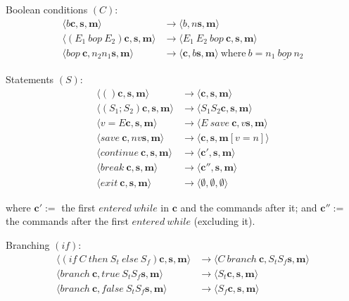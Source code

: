 \documentclass[11pt]{report}
\begin{document}
\vspace{2em}
\noindent Boolean conditions $(C)$:
\begin{align*}
\langle b  \bm{c},  \bm{s},  \bm{m} \rangle    &\rightarrow   \langle b, n  \bm{s},  \bm{m} \rangle \\
\langle (E_1 \ bop \ E_2)  \bm{c},  \bm{s},  \bm{m} \rangle    &\rightarrow   \langle E_1\ E_2\ bop \ \bm{c},  \bm{s},  \bm{m} \rangle \\
\langle bop \  \bm{c}, n_2 n_1  \bm{s},  \bm{m} \rangle    &\rightarrow   \langle  \bm{c}, b  \bm{s},  \bm{m} \rangle \  \text{where} \ b = n_1\ \underline{bop}\ n_2
\end{align*}


\vspace{2em}
\noindent Statements $(S)$:
\begin{align*}
\langle ()  \bm{c},  \bm{s},  \bm{m} \rangle    &\rightarrow   \langle  \bm{c},  \bm{s},  \bm{m} \rangle \\
\langle (S_1 ; S_2)  \bm{c},  \bm{s},  \bm{m} \rangle    &\rightarrow   \langle S_1 S_2  \bm{c},  \bm{s},  \bm{m} \rangle \\
\langle v=E  \bm{c},  \bm{s},  \bm{m} \rangle    &\rightarrow   \langle E\ save\  \bm{c}, v  \bm{s},  \bm{m} \rangle \\
\langle save \  \bm{c}, n v  \bm{s},  \bm{m} \rangle    &\rightarrow   \langle  \bm{c},  \bm{s},  \bm{m}[v=n] \rangle \\
\langle continue \  \bm{c}, \bm{s},  \bm{m} \rangle    &\rightarrow   \langle  \bm{c'},  \bm{s},  \bm{m} \rangle \\
\langle break \  \bm{c}, \bm{s},  \bm{m} \rangle    &\rightarrow   \langle  \bm{c''},  \bm{s},  \bm{m} \rangle \\
\langle exit \  \bm{c}, \bm{s},  \bm{m} \rangle    &\rightarrow   \langle  \emptyset,  \emptyset, \emptyset \rangle
\end{align*}

where $\bm{c'} :=$  the first $entered\ while$ in $\bm{c}$ and the commands after it; and $\bm{c''} :=$ the commands after the first $entered\ while$ (excluding it).


\newpage
\noindent Branching $(if)$:
\begin{align*}
\langle (if\ C\ then\ S_t\ else\ S_f)  \bm{c},  \bm{s},  \bm{m} \rangle    &\rightarrow   \langle C\ branch\  \bm{c}, S_t S_f  \bm{s},  \bm{m} \rangle \\
\langle branch\  \bm{c}, true\  S_t S_f  \bm{s},  \bm{m} \rangle    &\rightarrow   \langle S_t  \bm{c},  \bm{s},  \bm{m} \rangle \\
\langle branch\  \bm{c}, false\ S_t S_f  \bm{s},  \bm{m} \rangle    &\rightarrow   \langle S_f  \bm{c},  \bm{s},  \bm{m} \rangle
\end{align*}
\end{document}
